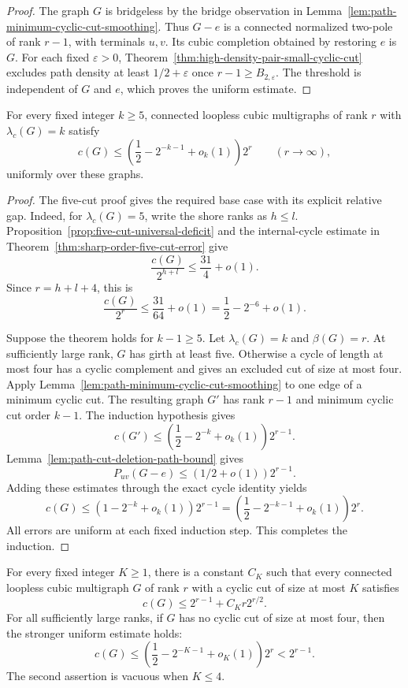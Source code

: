 \begin{proof}
The graph $G$ is bridgeless by the bridge observation in Lemma~\ref{lem:path-minimum-cyclic-cut-smoothing}.
Thus $G-e$ is a connected normalized two-pole of rank $r-1$, with terminals $u,v$.
Its cubic completion obtained by restoring $e$ is $G$.
For each fixed $\varepsilon>0$, Theorem~\ref{thm:high-density-pair-small-cyclic-cut} excludes path density at least $1/2+\varepsilon$ once $r-1\ge B_{2,\varepsilon}$.
The threshold is independent of $G$ and $e$, which proves the uniform estimate.
\end{proof}

\begin{theorem}
\label{thm:path-fixed-cyclic-order-deficit}
For every fixed integer $k\ge5$, connected loopless cubic multigraphs of rank $r$ with $\lambda_c(G)=k$ satisfy
\[
 c(G)\le\left(\frac12-2^{-k-1}+o_k(1)\right)2^r
 \qquad(r\to\infty),
\]
uniformly over these graphs.
\end{theorem}

\begin{proof}
The five-cut proof gives the required base case with its explicit relative gap.
Indeed, for $\lambda_c(G)=5$, write the shore ranks as $h\le l$.
Proposition~\ref{prop:five-cut-universal-deficit} and the internal-cycle estimate in Theorem~\ref{thm:sharp-order-five-cut-error} give
\[
 \frac{c(G)}{2^{h+l}}\le\frac{31}{4}+o(1).
\]
Since $r=h+l+4$, this is
\[
 \frac{c(G)}{2^r}\le\frac{31}{64}+o(1)
 =\frac12-2^{-6}+o(1).
\]

Suppose the theorem holds for $k-1\ge5$.
Let $\lambda_c(G)=k$ and $\beta(G)=r$.
At sufficiently large rank, $G$ has girth at least five.
Otherwise a cycle of length at most four has a cyclic complement and gives an excluded cut of size at most four.
Apply Lemma~\ref{lem:path-minimum-cyclic-cut-smoothing} to one edge of a minimum cyclic cut.
The resulting graph $G'$ has rank $r-1$ and minimum cyclic cut order $k-1$.
The induction hypothesis gives
\[
 c(G')\le\left(\frac12-2^{-k}+o_k(1)\right)2^{r-1}.
\]
Lemma~\ref{lem:path-cut-deletion-path-bound} gives
\[
 P_{uv}(G-e)\le(1/2+o(1))2^{r-1}.
\]
Adding these estimates through the exact cycle identity yields
\[
 c(G)\le\left(1-2^{-k}+o_k(1)\right)2^{r-1}
 =\left(\frac12-2^{-k-1}+o_k(1)\right)2^r.
\]
All errors are uniform at each fixed induction step.
This completes the induction.
\end{proof}

\begin{corollary}
\label{cor:path-all-fixed-cyclic-cuts-sharp}
For every fixed integer $K\ge1$, there is a constant $C_K$ such that every connected loopless cubic multigraph $G$ of rank $r$ with a cyclic cut of size at most $K$ satisfies
\[
 c(G)\le2^{r-1}+C_K r2^{r/2}.
\]
For all sufficiently large ranks, if $G$ has no cyclic cut of size at most four, then the stronger uniform estimate holds:
\[
 c(G)\le\left(\frac12-2^{-K-1}+o_K(1)\right)2^r<2^{r-1}.
\]
The second assertion is vacuous when $K\le4$.
\end{corollary}

